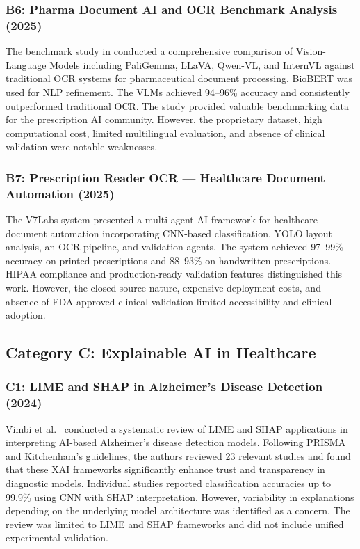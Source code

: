 \documentclass[conference]{IEEEtran}
\begin{document}
\subsubsection{B6: Pharma Document AI and OCR Benchmark Analysis (2025)}

The benchmark study in \cite{intuitionlabs2026pharma} conducted a comprehensive comparison of Vision-Language Models including PaliGemma, LLaVA, Qwen-VL, and InternVL against traditional OCR systems for pharmaceutical document processing. BioBERT was used for NLP refinement. The VLMs achieved 94--96\% accuracy and consistently outperformed traditional OCR. The study provided valuable benchmarking data for the prescription AI community. However, the proprietary dataset, high computational cost, limited multilingual evaluation, and absence of clinical validation were notable weaknesses.

\subsubsection{B7: Prescription Reader OCR --- Healthcare Document Automation (2025)}

The V7Labs system \cite{kin2024medical} presented a multi-agent AI framework for healthcare document automation incorporating CNN-based classification, YOLO layout analysis, an OCR pipeline, and validation agents. The system achieved 97--99\% accuracy on printed prescriptions and 88--93\% on handwritten prescriptions. HIPAA compliance and production-ready validation features distinguished this work. However, the closed-source nature, expensive deployment costs, and absence of FDA-approved clinical validation limited accessibility and clinical adoption.

\subsection{Category C: Explainable AI in Healthcare}

\subsubsection{C1: LIME and SHAP in Alzheimer's Disease Detection (2024)}

Vimbi et al.\ \cite{kumar2025doctors} conducted a systematic review of LIME and SHAP applications in interpreting AI-based Alzheimer's disease detection models. Following PRISMA and Kitchenham's guidelines, the authors reviewed 23 relevant studies and found that these XAI frameworks significantly enhance trust and transparency in diagnostic models. Individual studies reported classification accuracies up to 99.9\% using CNN with SHAP interpretation. However, variability in explanations depending on the underlying model architecture was identified as a concern. The review was limited to LIME and SHAP frameworks and did not include unified experimental validation.
\end{document}
